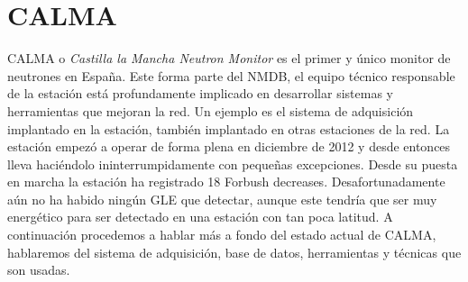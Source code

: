 \section{CALMA}
	CALMA\cite{Medina2013} o \emph{Castilla la Mancha Neutron Monitor} es el primer y único monitor de neutrones en España. Este forma parte del
	NMDB, el equipo técnico responsable de la estación está profundamente implicado en desarrollar sistemas y herramientas que mejoran la red. Un
	ejemplo es el sistema de adquisición implantado en la estación, también implantado en otras estaciones de la red. La estación empezó a operar
	de forma plena en diciembre de 2012 y desde entonces lleva haciéndolo ininterrumpidamente con pequeñas excepciones. Desde su puesta en marcha
	la estación ha registrado 18 Forbush decreases. Desafortunadamente aún no ha habido ningún GLE que detectar, aunque este tendría que ser muy
	energético para ser detectado en una estación con tan poca latitud. A continuación procedemos a hablar más a fondo del estado actual de CALMA,
	hablaremos del sistema de adquisición, base de datos, herramientas y técnicas que son usadas.
